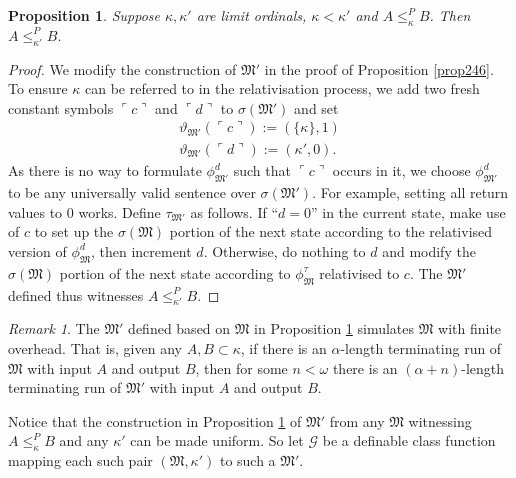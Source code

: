 \documentclass[12pt, twoside]{memoir}
\numberwithin{equation}{section}
\newtheorem{prop}[thm]{Proposition}
\theoremstyle{definition}
\theoremstyle{remark}
\newtheorem{rem}[thm]{Remark}
\theoremstyle{definition}
\theoremstyle{definition}
\theoremstyle{definition}
\theoremstyle{remark}
\begin{document}
\begin{prop}\label{prop252}
Suppose $\kappa, \kappa'$ are limit ordinals, $\kappa < \kappa'$ and $A \leq^P_{\kappa} B$. Then $A \leq^P_{\kappa'} B$.
\end{prop}

\begin{proof}
We modify the construction of $\mathfrak{M}'$ in the proof of Proposition \ref{prop246}. To ensure $\kappa$ can be referred to in the relativisation process, we add two fresh constant symbols $\ulcorner c \urcorner$ and $\ulcorner d \urcorner$ to $\sigma(\mathfrak{M'})$ and set
\begin{gather*}
    \vartheta_{\mathfrak{M}'}(\ulcorner c \urcorner) := (\{\kappa\}, 1) \\
    \vartheta_{\mathfrak{M}'}(\ulcorner d \urcorner) := (\kappa', 0) \text{.}
\end{gather*}
As there is no way to formulate $\phi^d_{\mathfrak{M}'}$ such that $\ulcorner c \urcorner$ occurs in it, we choose $\phi^d_{\mathfrak{M}'}$ to be any universally valid sentence over $\sigma(\mathfrak{M'})$. For example, setting all return values to $0$ works. Define $\tau_{\mathfrak{M}'}$ as follows. If ``$d = 0$'' in the current state, make use of $c$ to set up the $\sigma(\mathfrak{M})$ portion of the next state according to the relativised version of $\phi^d_{\mathfrak{M}}$, then increment $d$. Otherwise, do nothing to $d$ and modify the $\sigma(\mathfrak{M})$ portion of the next state according to $\phi^{\tau}_{\mathfrak{M}}$ relativised to $c$. The $\mathfrak{M}'$ defined thus witnesses $A \leq^P_{\kappa'} B$.
\end{proof}

\begin{rem}\label{rem256}
The $\mathfrak{M}'$ defined based on $\mathfrak{M}$ in Proposition \ref{prop252} simulates $\mathfrak{M}$ with finite overhead. That is, given any $A, B \subset \kappa$, if there is an $\alpha$-length terminating run of $\mathfrak{M}$ with input $A$ and output $B$, then for some $n < \omega$ there is an $(\alpha + n)$-length terminating run of $\mathfrak{M}'$ with input $A$ and output $B$.
\end{rem}

Notice that the construction in Proposition \ref{prop252} of $\mathfrak{M}'$ from any $\mathfrak{M}$ witnessing $A \leq^P_{\kappa} B$ and any $\kappa'$ can be made uniform. So let $\mathcal{G}$ be a definable class function mapping each such pair $(\mathfrak{M}, \kappa')$ to such a $\mathfrak{M}'$.
\end{document}
